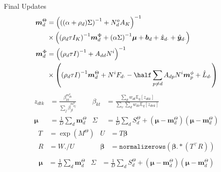 \documentclass[xcolor=dvipsnames]{beamer}
\newcommand \vv[1]   { { \boldsymbol{#1} } }
\newcommand \T       { { ^\top } }
\newcommand \ex[2]   { { \mathbb{E}_{{#1}}\left[ #2 \right] } }
\newcommand \mtd { { \boldsymbol{m}_d^{\Theta} } }
\newcommand \std { { S_d^{\Theta}              } }
\newcommand \mpd { { \boldsymbol{m}_d^{\Phi}   } }
\newcommand \invb[1]  { { \left( #1 \right)^{-1}     } }
\begin{document}
\begin{frame}{Final Updates}
\small
\begin{align*}
\mtd &= \invb{ \invb{(\alpha + \rho_d)\Sigma} + N^o_d A_K } \\
    & \times
            \left(
                \invb{\rho_d \tau I_K} \mpd
                + \invb{\alpha \Sigma}\vv{\mu}
                + \vv{b}_d 
                + \hat{\vv{z}}_{d\cdot}
                + \hat{\vv{y}}_{d\cdot}
            \right) \\
 \mpd & = \invb{\invb{\rho_d \tau I} + A_{dd}N^i} \\
  & \times
             \left(
                 \invb{\rho_d \tau I}\mtd + N^i F_{d\cdot} -\half \sum_{p \neq d} A_{dp} N^i \vv{m}^\phi_p + \hat{L}_{d\cdot}
             \right)
\end{align*}
 {
     \begin{align*}
     z_{dtk}    & = \frac{\beta_{kt}^{m^\theta_{dk}}}{\sum_j \beta_{jt}^{m^\theta_{dj}}} &
     \beta_{kt} & = \frac{\sum_d w_{dt}\ex{q}{z_{dtk}}}{\sum_v \sum_d w_{dv}\ex{q}{z_{dvk}}} \\
     \vv{\mu} & = \frac{1}{D}\sum_d \mtd &
     \Sigma   & = \frac{1}{D}\sum_d \std + (\vv{\mu} - \mtd)(\vv{\mu} - \mtd)
     \end{align*}
}
 {
    \begin{align*}
    T & = \exp(M^{\Theta}) &
    U & = T \vv{\beta} \\
    R & = W ./ U &
    \vv{\beta} & = \texttt{normalizerows}(\vv{\beta} .* (T\T R))\\
    \end{align*}
    \begin{align*}
    \vv{\mu} & = \frac{1}{D}\sum_d \mtd &
    \Sigma   & = \frac{1}{D}\sum_d \std + (\vv{\mu} - \mtd)(\vv{\mu} - \mtd)
    \end{align*}
}
\normalsize

\end{frame}


\end{document}
